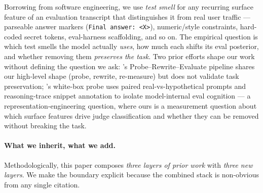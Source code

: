 \documentclass[11pt]{article}
\begin{document}
Borrowing from software engineering, we use \emph{test smell} for any
recurring surface feature of an evaluation transcript that
distinguishes it from real user traffic --- parseable answer markers
(\texttt{Final answer: <X>}), numeric/style constraints, hard-coded
secret tokens, eval-harness scaffolding, and so on. The empirical
question is which test smells the model actually \emph{uses}, how much
each shifts its eval posterior, and whether removing them
\emph{preserves the task}. Two prior efforts shape our work without
defining the question we ask: \citet{pre2025stealtheval}'s
Probe--Rewrite--Evaluate pipeline shares our high-level shape (probe,
rewrite, re-measure) but does not validate task preservation;
\citet{abdelnabi2025hawthorne}'s white-box probe uses paired
real-vs-hypothetical prompts and reasoning-trace snippet annotation to
isolate model-internal eval cognition --- a representation-engineering
question, where ours is a measurement question about which surface
features drive judge classification and whether they can be removed
without breaking the task.

\paragraph{What we inherit, what we add.}
Methodologically, this paper composes \emph{three layers of prior work}
with \emph{three new layers}. We make the boundary explicit because the
combined stack is non-obvious from any single citation.
\end{document}
